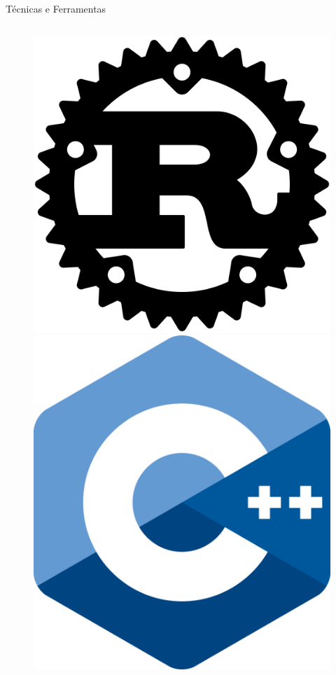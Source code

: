 \begin{frame}{Técnicas e Ferramentas}
\begin{columns}
    \begin{column}{0.1\textwidth}
        \begin{figure}
            \includegraphics[width=\textwidth]{Figuras/Rust Logo.svg.png}
            \vspace{10pt}
            \includegraphics[width=\textwidth]{Figuras/C++ Logo.png}
        \end{figure}
    \end{column}
    \end{columns}
\end{frame}

